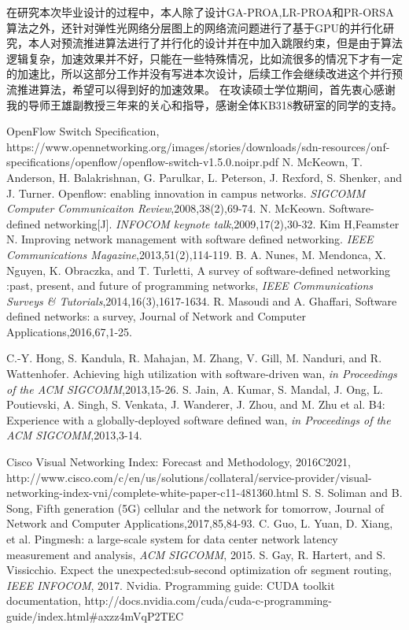 \documentclass[master]{thesis-uestc}
\begin{document}
在研究本次毕业设计的过程中，本人除了设计GA-PROA,LR-PROA和PR-ORSA算法之外，还针对弹性光网络分层图上的网络流问题进行了基于GPU的并行化研究，本人对预流推进算法进行了并行化的设计并在中加入跳限约束，但是由于算法逻辑复杂，加速效果并不好，只能在一些特殊情况，比如流很多的情况下才有一定的加速比，所以这部分工作并没有写进本次设计，后续工作会继续改进这个并行预流推进算法，希望可以得到好的加速效果。
\thesisacknowledgement
在攻读硕士学位期间，首先衷心感谢我的导师王雄副教授三年来的关心和指导，感谢全体KB318教研室的同学的支持。



\begin{thebibliography}{1}
OpenFlow Switch Specification, https://www.opennetworking.org/images\newline/stories/downloads/sdn-resources/onf-specifications/openflow/openflow-switch-v1.5.0.noipr.pdf
N. McKeown, T. Anderson, H. Balakrishnan, G. Parulkar, L. Peterson, J. Rexford, S. Shenker, and J. Turner. Openflow: enabling innovation in campus networks. \emph{SIGCOMM Computer Communicaiton Review},2008,38(2),69-74.
N. McKeown. Software-defined networking[J]. \emph{INFOCOM keynote talk},2009,17(2),30-32.
Kim H,Feamster N. Improving network management with software defined networking. \emph{IEEE Communications Magazine},2013,51(2),114-119.
B. A. Nunes, M. Mendonca, X. Nguyen, K. Obraczka, and T. Turletti, A survey of software-defined networking :past, present, and future of programming networks, \emph{IEEE Communications Surveys \& Tutorials},2014,16(3),1617-1634.
R. Masoudi and A. Ghaffari, Software defined networks: a survey, Journal of Network and Computer Applications,2016,67,1-25.


C.-Y. Hong, S. Kandula, R. Mahajan, M. Zhang, V. Gill, M. Nanduri, and R. Wattenhofer. Achieving high utilization with software-driven wan, \emph{in Proceedings of the ACM SIGCOMM},2013,15-26.
S. Jain, A. Kumar, S. Mandal, J. Ong, L. Poutievski, A. Singh, S. Venkata, J. Wanderer, J. Zhou, and M. Zhu et al. B4: Experience with a globally-deployed software defined wan, \emph{in Proceedings of the ACM SIGCOMM},2013,3-14.

Cisco Visual Networking Index: Forecast and Methodology, 2016C2021, http://www.cisco.com/c/en/us/solutions/collateral/service-provider/visual-networking-index-vni/complete-white-paper-c11-481360.html
S. S. Soliman and B. Song, Fifth generation (5G) cellular and the network for tomorrow, Journal of Network and Computer Applications,2017,85,84-93.
C. Guo, L. Yuan, D. Xiang, et al. Pingmesh: a large-scale system for data center network latency measurement and analysis, \emph{ACM SIGCOMM}, 2015.
S. Gay, R. Hartert, and S. Vissicchio. Expect the unexpected:sub-second optimization ofr segment routing, \emph{IEEE INFOCOM}, 2017.
Nvidia. Programming guide: CUDA toolkit documentation, http://docs.nvidia.com/cuda/cuda-c-programming-guide/index.html\#axzz4mVqP2TEC


\end{thebibliography}
\end{document}
